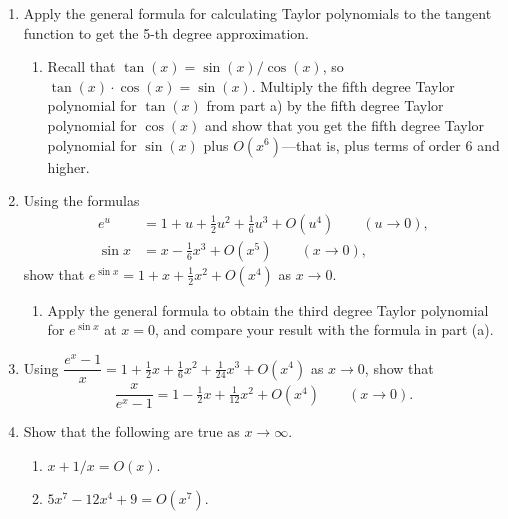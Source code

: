 \begin{enumerate}
\begin{enumerate}
  \item Using the previous parts, show $(\sin x)^2 + (\cos x)^2 = 1 +
O(x^5)$ as $x \rightarrow 0$.  (Of course, you already know $(\sin
x)^2 + (\cos x)^2 = 1$ {\em exactly}.)


\end{enumerate}
\item Apply the general formula for calculating Taylor polynomials to
the tangent function to get the 5-th degree approximation.



  \begin{enumerate}
  \item Recall that $\tan(x) = \sin(x)/\cos(x)$, so $\tan(x) \cdot
\cos(x) = \sin(x)$.  Multiply the fifth degree Taylor polynomial for
$\tan(x)$ from part a) by the fifth degree Taylor polynomial for
$\cos(x)$ and show that you get the fifth degree Taylor polynomial for
$\sin(x)$ plus $O(x^6)$---that is, plus terms of order 6 and higher.


\end{enumerate}
\item Using the formulas
\begin{align*}
e^u &= 1 + u + \tfrac{1}{2}u^2  + 
                \tfrac{1}{6} u^3 + O(u^4) \qquad (u \to 0), \\[4pt]
\sin{x} &= x - \tfrac{1}{6} x^3 + O(x^5) \qquad (x \to 0),
\end{align*}
show that $e^{\sin{x}} = 1 + x + \tfrac{1}{2} x^2 + O(x^4)$ as              $x \to 0$.

  \begin{enumerate}
  \item Apply the general formula to obtain the third degree Taylor
polynomial for $e^{\sin{x}}$ at $x = 0$, and compare your result with
the formula in part (a).


\end{enumerate}
\item Using $\dfrac{e^x -1}{x} = 1 + \tfrac{1}{2} x + \tfrac{1}{6} x^2 +
\tfrac{1}{24} x^3 + O(x^4)$ as $x \to 0$, show that
\[
\dfrac{x}{e^x - 1} = 1 - \tfrac{1}{2} x + 
    \tfrac{1}{12} x^2 + O(x^4) \qquad (x \to 0).
\]


\item Show that the following are true as $x \rightarrow \infty$.

  \begin{enumerate}
  \item $x + 1/x = O(x)$.

  \item $5x^7 - 12x^4 + 9 = O(x^7)$.


\end{enumerate}
\end{enumerate}
